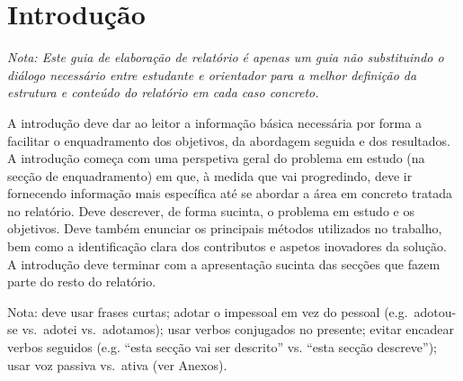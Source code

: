 \renewcommand{\thepage}{\arabic{page}}


\chapter{Introdu\c{c}\~ao} %
\label{chap:intro}
\textit{Nota: 	Este guia de elaboração de relatório é apenas um guia não substituindo o diálogo necessário entre estudante e orientador para a melhor definição da estrutura e conteúdo do relatório em cada caso concreto.}

\vspace{2cm}

A introdução deve dar ao leitor a informação básica necessária por forma a facilitar o enquadramento dos objetivos, da abordagem seguida e dos resultados. A introdução começa com uma perspetiva geral do problema em estudo (na secção de enquadramento) em que, à medida que vai progredindo, deve ir fornecendo informação mais específica até se abordar a área em concreto tratada no relatório. Deve descrever, de forma sucinta, o problema em estudo e os objetivos. Deve também enunciar os principais métodos utilizados no trabalho, bem como a identificação clara dos contributos e aspetos inovadores da solução. A introdução deve terminar com a apresentação sucinta das secções que fazem parte do resto do relatório.


Nota: deve usar frases curtas; adotar o impessoal em vez do pessoal (e.g.\ adotou-se vs.\ adotei vs.\ adotamos); usar verbos conjugados no presente; evitar encadear verbos seguidos (e.g. “esta secção vai ser descrito” vs. “esta secção descreve”); usar voz passiva vs.\ ativa (ver Anexos).






